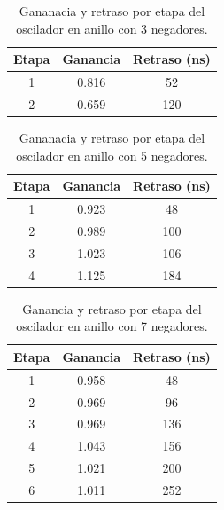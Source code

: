\documentclass[journal]{IEEEtran}
\begin{document}
\begin{table}[h]
	\renewcommand{\arraystretch}{1.1}
	\caption{Gananacia y retraso  por etapa del oscilador en anillo con 3 negadores.}
	\label{p4t1}
	\centering
	\begin{tabular}{|c|c|c|}
	\hline
	\bf Etapa & \bf Ganancia & \bf Retraso (ns) \\
	\hline
	1 & 0.816 & 52 \\
	\hline
	2 & 0.659 & 120 \\
	\hline
	\end{tabular}
\end{table}

\begin{table}[h]
	\renewcommand{\arraystretch}{1.1}
	\caption{Gananacia y retraso  por etapa del oscilador en anillo con 5 negadores.}
	\label{p4t2}
	\centering
	\begin{tabular}{|c|c|c|}%
	\hline
	\bf Etapa & \bf Ganancia & \bf Retraso (ns) \\
	\hline
	1 & 0.923 & 48 \\
	\hline
	2 & 0.989 & 100 \\
	\hline
	3 & 1.023 & 106 \\
	\hline
	4 & 1.125 & 184 \\
	\hline
	\end{tabular}
\end{table}

\begin{table}[h]
	\renewcommand{\arraystretch}{1.1}
	\caption{Ganancia y retraso  por etapa del oscilador en anillo con 7 negadores.}
	\label{p4t3}
	\centering
	\begin{tabular}{|c|c|c|}
	\hline
	\bf Etapa & \bf Ganancia & \bf Retraso (ns) \\
	\hline
	1 & 0.958 & 48 \\
	\hline
	2 & 0.969 & 96 \\
	\hline
	3 & 0.969 & 136\\
	\hline
	4 & 1.043 & 156 \\
	\hline
	5 & 1.021 & 200 \\
	\hline
	6 & 1.011 & 252 \\
	\hline
	\end{tabular}
\end{table}
\end{document}
